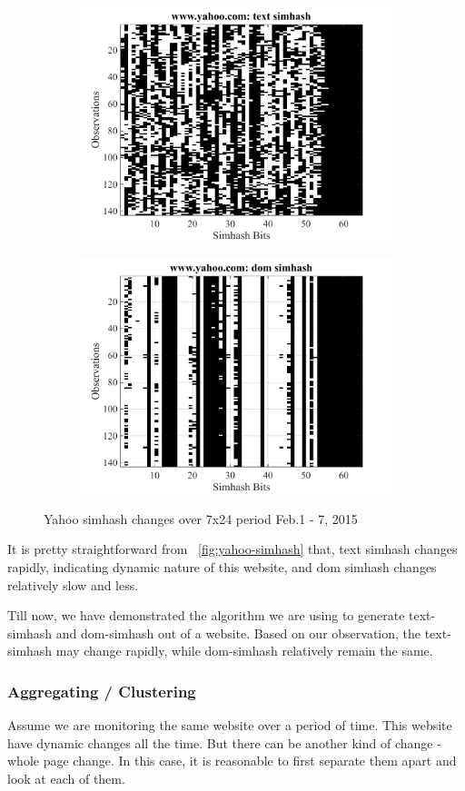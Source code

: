 \begin{figure}[t]
  \centering
  \begin{subfigure}
    \centering
    \includegraphics[width=.5\textwidth]{fig/yahoo-text-user}
    \label{fig:yahoo-text-user}
  \end{subfigure}%
  \begin{subfigure}
    \centering
    \includegraphics[width=.5\textwidth]{fig/yahoo-dom-user}
    \label{fig:yahoo-dom-user}
  \end{subfigure}
  \caption{Yahoo simhash changes over 7x24 period Feb.1 - 7, 2015}
  \label{fig:yahoo-simhash}
\end{figure}

It is pretty straightforward from ~\autoref{fig:yahoo-simhash} that,
text simhash changes rapidly, indicating dynamic nature of this
website, and dom simhash changes relatively slow and less.

Till now, we have demonstrated the algorithm we are using to generate
text-simhash and dom-simhash out of a website. Based on our observation, the
text-simhash may change rapidly, while dom-simhash relatively remain the same.

\subsubsection{Aggregating / Clustering}
Assume we are monitoring the same website over a period of time. This website
have dynamic changes all the time. But there can be another kind of change -
whole page change. In this case, it is reasonable to first separate them apart
and look at each of them.

